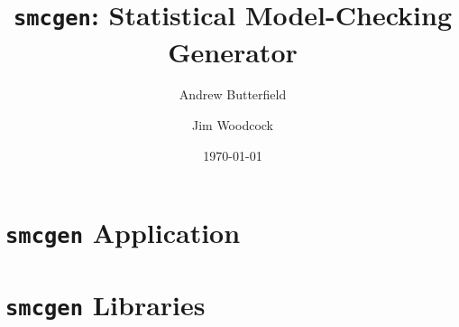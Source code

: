 \documentclass[fleqn,10pt]{report}
\author{
Andrew Butterfield \and Jim Woodcock
}
\title{
  \texttt{smcgen}:
  Statistical Model-Checking Generator
}
\date{
\today
}
\begin{document}
\maketitle
\tableofcontents
%
\chapter{\texttt{smcgen} Application}
%

%
\chapter{\texttt{smcgen} Libraries}
%
% 
\newpage

%
%
% 
%
%
%
%
% 
%
% 
%


\end{document}
